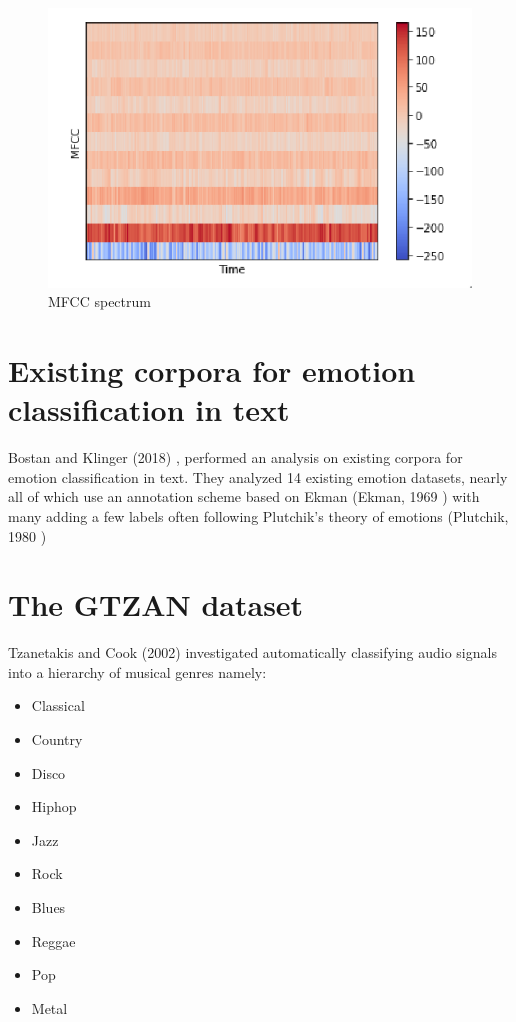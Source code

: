\begin{figure}[H]
\centering
\includegraphics[width=\textwidth]{imgs/mfcc.png}
\caption{MFCC spectrum}
\label{fig: mfcc}
\end{figure}


\section{Existing corpora for emotion classification in text}
Bostan and Klinger (2018) \cite{emotion_classification_datasets}, performed an analysis on existing corpora for emotion classification in text. They analyzed 14 existing emotion datasets, nearly all of which use an annotation scheme based on Ekman (Ekman, 1969 \cite{ekman_pan-cultural_1969}) with many adding a few labels often following Plutchik’s theory of emotions (Plutchik, 1980 \cite{plutchik_emotions})


\section{The GTZAN dataset}
Tzanetakis and Cook (2002)\cite{tzanetakis_musical_2002}  investigated automatically classifying audio signals into a hierarchy of musical genres namely:

\begin{itemize}
	\item Classical
	\item Country
	\item Disco
	\item Hiphop
	\item Jazz
	\item Rock
	\item Blues
	\item Reggae
	\item Pop
	\item Metal
\end{itemize}

